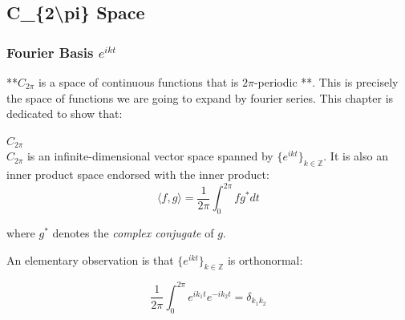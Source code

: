 \subsection{C\_\{2{\textbackslash}pi\} Space}

%
\providecommand{\argmin}{\operatorname*{arg\,min}}%
\providecommand{\argmax}{\operatorname*{arg\,max}}%
\subsubsection{Fourier Basis $e^{ikt}$}

**$C_{2\pi}$  is a space of  continuous functions that is $2\pi$-periodic **. This is precisely the space of functions we are going to expand by fourier series. This chapter is dedicated to show that:

\begin{theorem}\textbf{$C_{2\pi}$}\\
$C_{2\pi}$ is an infinite-dimensional vector space spanned by $\{e^{ikt}\}_{k\in\mathbb{Z}}$. It is also an inner product space endorsed with the inner product:
\begin{equation}
\langle f,g \rangle = \frac{1}{2\pi}\int_{0}^{2\pi} fg^*dt
\end{equation}

\end{theorem}where $g^*$ denotes the \textit{complex conjugate} of $g$.

An elementary observation is that  $\{e^{ikt}\}_{k\in\mathbb{Z}}$ is orthonormal:

\begin{equation}
\frac{1}{2\pi}\int_0^{2\pi}e^{ik_1t}e^{-ik_2t}=\delta_{k_1k_2}
\end{equation}


